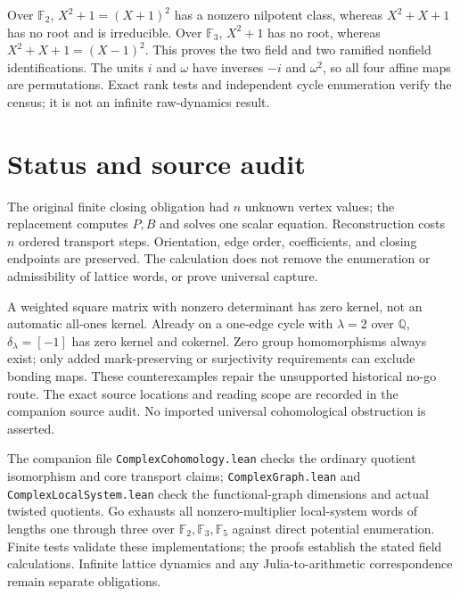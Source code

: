 \documentclass[11pt,letterpaper]{article}
\newcommand{\Q}{\mathbb{Q}}
\begin{document}
Over \(\mathbb F_2\), \(X^2+1=(X+1)^2\) has a nonzero nilpotent class, whereas \(X^2+X+1\) has no root and is irreducible. Over \(\mathbb F_3\), \(X^2+1\) has no root, whereas \(X^2+X+1=(X-1)^2\). This proves the two field and two ramified nonfield identifications. The units \(i\) and \(\omega\) have inverses \(-i\) and \(\omega^2\), so all four affine maps are permutations. Exact rank tests and independent cycle enumeration verify the census; it is not an infinite raw-dynamics result.

\section{Status and source audit}

The original finite closing obligation had \(n\) unknown vertex values; the replacement computes \(P,B\) and solves one scalar equation. Reconstruction costs \(n\) ordered transport steps. Orientation, edge order, coefficients, and closing endpoints are preserved. The calculation does not remove the enumeration or admissibility of lattice words, or prove universal capture.

A weighted square matrix with nonzero determinant has zero kernel, not an automatic all-ones kernel. Already on a one-edge cycle with \(\lambda=2\) over \(\Q\), \(\delta_\lambda=[-1]\) has zero kernel and cokernel. Zero group homomorphisms always exist; only added mark-preserving or surjectivity requirements can exclude bonding maps. These counterexamples repair the unsupported historical no-go route. The exact source locations and reading scope are recorded in the companion source audit. No imported universal cohomological obstruction is asserted.

The companion file \texttt{Complex\allowbreak Cohomology.\allowbreak lean} checks the ordinary quotient isomorphism and core transport claims; \texttt{Complex\allowbreak Graph.\allowbreak lean} and \texttt{Complex\allowbreak Local\allowbreak System.\allowbreak lean} check the functional-graph dimensions and actual twisted quotients. Go exhausts all nonzero-multiplier local-system words of lengths one through three over \(\mathbb F_2,\mathbb F_3,\mathbb F_5\) against direct potential enumeration. Finite tests validate these implementations; the proofs establish the stated field calculations. Infinite lattice dynamics and any Julia-to-arithmetic correspondence remain separate obligations.
\end{document}
